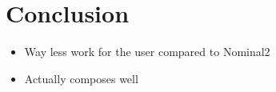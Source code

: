 \chapter{Conclusion}

\begin{itemize}
\item{Way less work for the user compared to Nominal2}
\item{Actually composes well}
\end{itemize}
